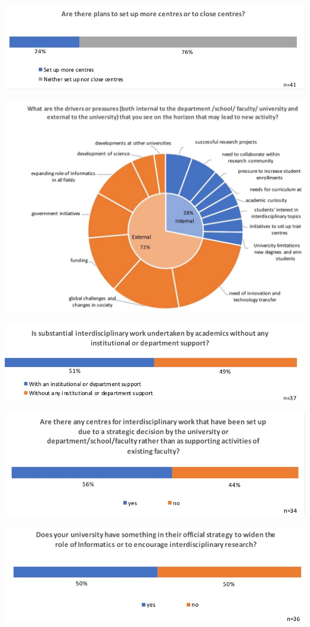 \includegraphics[width = \linewidth]{charts/5f.jpg}

\includegraphics[width = \linewidth]{charts/5g.jpg}

\includegraphics[width = \linewidth]{charts/5h.jpg}

\includegraphics[width = \linewidth]{charts/5i.jpg}

\includegraphics[width = \linewidth]{charts/5j.jpg}